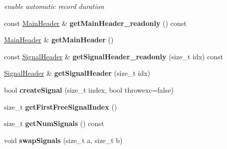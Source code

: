 \begin{DoxyCompactItemize}
\begin{DoxyCompactList}\small\item\em enable automatic record duration \item\end{DoxyCompactList}\item 
\hypertarget{classgdf_1_1_g_d_f_header_access_a83c19c8e3984ea3373a9eff57d9417d6}{
const \hyperlink{classgdf_1_1_main_header}{MainHeader} \& {\bfseries getMainHeader\_\-readonly} () const }
\label{classgdf_1_1_g_d_f_header_access_a83c19c8e3984ea3373a9eff57d9417d6}

\item 
\hypertarget{classgdf_1_1_g_d_f_header_access_af5ad6f26f1cf3b2db86cf08fd51316ac}{
\hyperlink{classgdf_1_1_main_header}{MainHeader} \& {\bfseries getMainHeader} ()}
\label{classgdf_1_1_g_d_f_header_access_af5ad6f26f1cf3b2db86cf08fd51316ac}

\item 
\hypertarget{classgdf_1_1_g_d_f_header_access_aa654d1657093402ec458e47ba7518f81}{
const \hyperlink{classgdf_1_1_signal_header}{SignalHeader} \& {\bfseries getSignalHeader\_\-readonly} (size\_\-t idx) const }
\label{classgdf_1_1_g_d_f_header_access_aa654d1657093402ec458e47ba7518f81}

\item 
\hypertarget{classgdf_1_1_g_d_f_header_access_a148a1ae5e2392fe01f8507bcaa01d640}{
\hyperlink{classgdf_1_1_signal_header}{SignalHeader} \& {\bfseries getSignalHeader} (size\_\-t idx)}
\label{classgdf_1_1_g_d_f_header_access_a148a1ae5e2392fe01f8507bcaa01d640}

\item 
\hypertarget{classgdf_1_1_g_d_f_header_access_a839d121ae6eef7957b40bce3c94ace59}{
bool {\bfseries createSignal} (size\_\-t index, bool throwexc=false)}
\label{classgdf_1_1_g_d_f_header_access_a839d121ae6eef7957b40bce3c94ace59}

\item 
\hypertarget{classgdf_1_1_g_d_f_header_access_a153f525fefd16cdd081f7b0608c1a55b}{
size\_\-t {\bfseries getFirstFreeSignalIndex} ()}
\label{classgdf_1_1_g_d_f_header_access_a153f525fefd16cdd081f7b0608c1a55b}

\item 
\hypertarget{classgdf_1_1_g_d_f_header_access_ad6352ce5ccbeb9221353822056e32651}{
size\_\-t {\bfseries getNumSignals} () const }
\label{classgdf_1_1_g_d_f_header_access_ad6352ce5ccbeb9221353822056e32651}

\item 
\hypertarget{classgdf_1_1_g_d_f_header_access_a39608e2b25e30765ed88278c66194383}{
void {\bfseries swapSignals} (size\_\-t a, size\_\-t b)}
\label{classgdf_1_1_g_d_f_header_access_a39608e2b25e30765ed88278c66194383}


\end{DoxyCompactItemize}
